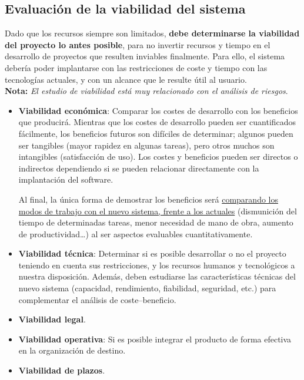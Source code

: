 \subsection{Evaluación de la viabilidad del sistema}

Dado que los recursos siempre son limitados, \textbf{debe determinarse la viabilidad del proyecto lo antes posible}, para no invertir recursos y tiempo en el desarrollo de proyectos que resulten inviables finalmente. Para ello, el sistema debería poder implantarse con las restricciones de coste y tiempo con las tecnologías actuales, y con un alcance que le resulte útil al usuario.\\

\textbf{Nota:} \textit{El estudio de viabilidad está muy relacionado con el análisis de riesgos}.

\begin{itemize}
    \item \textbf{Viabilidad económica}: Comparar los costes de desarrollo con los beneficios que producirá. Mientras que los costes de desarrollo pueden ser cuantificados fácilmente, los beneficios futuros son difíciles de determinar; algunos pueden ser tangibles (mayor rapidez en algunas tareas), pero otros muchos son intangibles (satisfacción de uso). Los costes y beneficios pueden ser directos o indirectos dependiendo si se pueden relacionar directamente con la implantación del software.
    
    Al final, la única forma de demostrar los beneficios será \uline{comparando los modos de trabajo con el nuevo sistema, frente a los actuales} (dismunición del tiempo de determinadas tareas, menor necesidad de mano de obra, aumento de productividad\ldots) al ser aspectos evaluables cuantitativamente.
    \item \textbf{Viabilidad técnica}: Determinar si es posible desarrollar o no el proyecto teniendo en cuenta sus restricciones, y los recursos humanos y tecnológicos a nuestra disposición. Además, deben estudiarse las características técnicas del nuevo sistema (capacidad, rendimiento, fiabilidad, seguridad, etc.) para complementar el análisis de coste--beneficio. 
    \item \textbf{Viabilidad legal}.
    \item \textbf{Viabilidad operativa}: Si es posible integrar el producto de forma efectiva en la organización de destino.
    \item \textbf{Viabilidad de plazos}.
\end{itemize}

